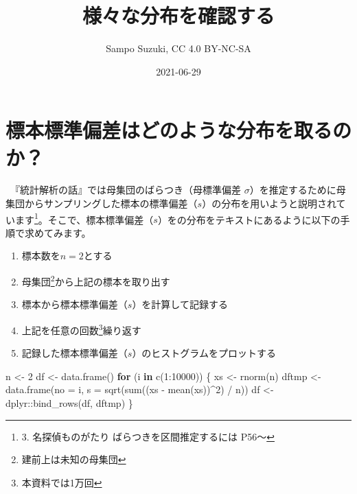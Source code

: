 \documentclass[]{tufte-handout}
\title[様々な分布を確認する]{様々な分布を確認する}
\author{Sampo Suzuki, CC 4.0 BY-NC-SA}
\date{2021-06-29}
\newenvironment{Shaded}{}{}
\newcommand{\AttributeTok}[1]{\textcolor[rgb]{0.49,0.56,0.16}{#1}}
\newcommand{\ControlFlowTok}[1]{\textcolor[rgb]{0.00,0.44,0.13}{\textbf{#1}}}
\newcommand{\DecValTok}[1]{\textcolor[rgb]{0.25,0.63,0.44}{#1}}
\newcommand{\FunctionTok}[1]{\textcolor[rgb]{0.02,0.16,0.49}{#1}}
\newcommand{\NormalTok}[1]{#1}
\newcommand{\OtherTok}[1]{\textcolor[rgb]{0.00,0.44,0.13}{#1}}
\newcommand{\SpecialCharTok}[1]{\textcolor[rgb]{0.25,0.44,0.63}{#1}}
\providecommand{\tightlist}{%
  \setlength{\itemsep}{0pt}\setlength{\parskip}{0pt}}
\begin{document}
\maketitle




\hypertarget{ux6a19ux672cux6a19ux6e96ux504fux5deeux306fux3069ux306eux3088ux3046ux306aux5206ux5e03ux3092ux53d6ux308bux306eux304b}{%
\section{標本標準偏差はどのような分布を取るのか？}\label{ux6a19ux672cux6a19ux6e96ux504fux5deeux306fux3069ux306eux3088ux3046ux306aux5206ux5e03ux3092ux53d6ux308bux306eux304b}}

　『統計解析の話』\citep{ToukeiKaisekinoHanashi}では母集団のばらつき（母標準偏差
\(\sigma\)）を推定するために母集団からサンプリングした標本の標準偏差（\(s\)）の分布を用いようと説明されています\footnote{3.
  名探偵ものがたり ばらつきを区間推定するには P56〜}。そこで、標本標準偏差（\(s\)）をの分布をテキストにあるように以下の手順で求めてみます。

\begin{enumerate}
\def\labelenumi{\arabic{enumi}.}
\tightlist
\item
  標本数を\(n = 2\)とする
\item
  母集団\footnote{建前上は未知の母集団}から上記の標本を取り出す
\item
  標本から標本標準偏差（\(s\)）を計算して記録する
\item
  上記を任意の回数\footnote{本資料では1万回}繰り返す
\item
  記録した標本標準偏差（\(s\)）のヒストグラムをプロットする
\end{enumerate}

\begin{Shaded}
\begin{Highlighting}[numbers=left,,]
\NormalTok{n }\OtherTok{\textless{}{-}} \DecValTok{2}
\NormalTok{df }\OtherTok{\textless{}{-}} \FunctionTok{data.frame}\NormalTok{()}
\ControlFlowTok{for}\NormalTok{ (i }\ControlFlowTok{in} \FunctionTok{c}\NormalTok{(}\DecValTok{1}\SpecialCharTok{:}\DecValTok{10000}\NormalTok{)) \{}
\NormalTok{  xs }\OtherTok{\textless{}{-}} \FunctionTok{rnorm}\NormalTok{(n)}
\NormalTok{  dftmp }\OtherTok{\textless{}{-}} \FunctionTok{data.frame}\NormalTok{(}\AttributeTok{no =}\NormalTok{ i, }\AttributeTok{s =} \FunctionTok{sqrt}\NormalTok{(}\FunctionTok{sum}\NormalTok{((xs }\SpecialCharTok{{-}} \FunctionTok{mean}\NormalTok{(xs))}\SpecialCharTok{\^{}}\DecValTok{2}\NormalTok{) }\SpecialCharTok{/}\NormalTok{ n))}
\NormalTok{  df }\OtherTok{\textless{}{-}}\NormalTok{ dplyr}\SpecialCharTok{::}\FunctionTok{bind\_rows}\NormalTok{(df, dftmp)}
\NormalTok{\}}
\end{Highlighting}
\end{Shaded}
\end{document}
